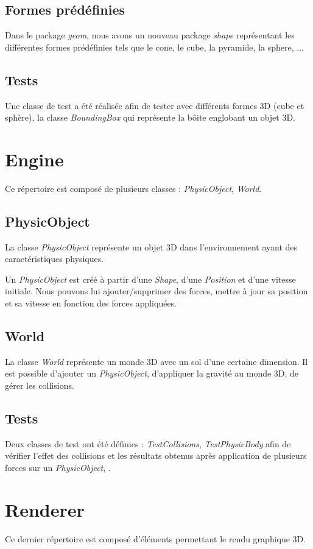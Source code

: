 \documentclass[11pt]{report}
\begin{document}
\subsection{Formes prédéfinies}
Dans le package \textit{geom}, nous avons un nouveau package \textit{shape} représentant les différentes formes prédéfinies tels que le cone, le cube, la pyramide, la sphere, ...

\subsection{Tests}
Une classe de test a été réalisée afin de tester avec différents formes 3D (cube et sphère), la classe \textit{BoundingBox} qui représente la bôite englobant un objet 3D.

\section{Engine}
Ce répertoire est composé de plusieurs classes : \textit{PhysicObject}, \textit{World}.

\subsection{PhysicObject}
La classe \textit{PhysicObject} représente un objet 3D dans l'environnement ayant des caractéristiques physiques.

Un \textit{PhysicObject} est créé à partir d'une \textit{Shape}, d'une \textit{Position} et d'une vitesse initiale.
Nous pouvons lui ajouter/supprimer des forces, mettre à jour sa position et sa vitesse en fonction des forces appliquées.

\subsection{World}
La classe \textit{World} représente un monde 3D avec un sol d'une certaine dimension. Il est possible d'ajouter un \textit{PhysicObject}, d'appliquer la gravité au monde 3D, de gérer les collisions.

\subsection{Tests}
Deux classes de test ont été définies : \textit{TestCollisions}, \textit{TestPhysicBody} afin de vérifier l'effet des collisions et les résultats obtenus après application de plusieurs forces sur un \textit{PhysicObject}, .

\section{Renderer}
Ce dernier répertoire est composé d'éléments permettant le rendu graphique 3D.
\end{document}
